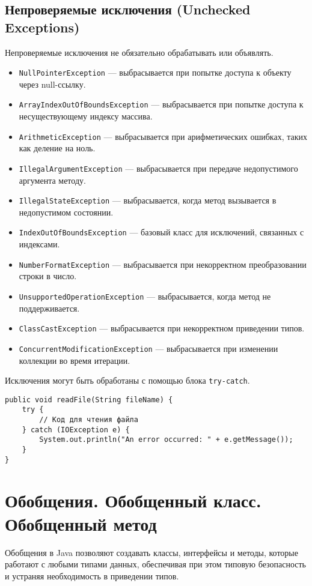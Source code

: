 \documentclass[12pt, a4paper]{article}
\begin{document}
\subsection*{Непроверяемые исключения (Unchecked Exceptions)}
Непроверяемые исключения не обязательно обрабатывать или объявлять.
\begin{itemize}
    \item \texttt{NullPointerException} — выбрасывается при попытке доступа к объекту через null-ссылку.
    \item \texttt{ArrayIndexOutOfBoundsException} — выбрасывается при попытке доступа к несуществующему индексу массива.
    \item \texttt{ArithmeticException} — выбрасывается при арифметических ошибках, таких как деление на ноль.
    \item \texttt{IllegalArgumentException} — выбрасывается при передаче недопустимого аргумента методу.
    \item \texttt{IllegalStateException} — выбрасывается, когда метод вызывается в недопустимом состоянии.
    \item \texttt{IndexOutOfBoundsException} — базовый класс для исключений, связанных с индексами.
    \item \texttt{NumberFormatException} — выбрасывается при некорректном преобразовании строки в число.
    \item \texttt{UnsupportedOperationException} — выбрасывается, когда метод не поддерживается.
    \item \texttt{ClassCastException} — выбрасывается при некорректном приведении типов.
    \item \texttt{ConcurrentModificationException} — выбрасывается при изменении коллекции во время итерации.
\end{itemize}
Исключения могут быть обработаны с помощью блока \texttt{try-catch}.

\begin{verbatim}
public void readFile(String fileName) {
    try {
        // Код для чтения файла
    } catch (IOException e) {
        System.out.println("An error occurred: " + e.getMessage());
    }
}
\end{verbatim}


\section{Обобщения. Обобщенный класс. Обобщенный метод}
Обобщения в Java позволяют создавать классы, интерфейсы и методы, которые работают с любыми типами данных, обеспечивая при этом типовую безопасность и устраняя необходимость в приведении типов.
\end{document}
